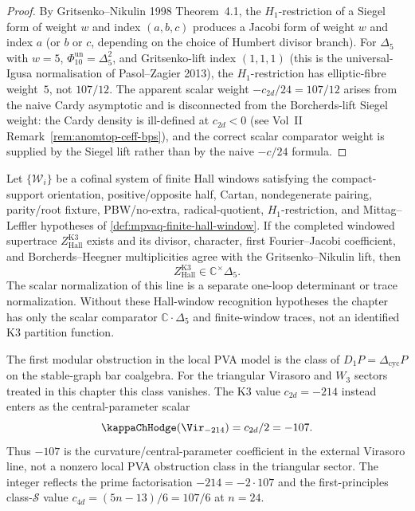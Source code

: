 \begin{proof}
By Gritsenko--Nikulin 1998 Theorem~4.1, the $H_1$-restriction of
a Siegel form of weight $w$ and index $(a,b,c)$ produces a
Jacobi form of weight $w$ and index $a$ (or $b$ or $c$, depending
on the choice of Humbert divisor branch). For
$\Delta_5$ with $w = 5$, $\Phi_{10}^{\mathrm{un}}=\Delta_5^2$, and Gritsenko-lift
index $(1, 1, 1)$ (this is the universal-Igusa normalisation of
Pasol--Zagier 2013), the $H_1$-restriction has
elliptic-fibre weight~$5$, not $107/12$. The apparent scalar weight
$-c_{2d}/24 = 107/12$ arises from the naive Cardy asymptotic and
is disconnected from the Borcherds-lift Siegel weight: the Cardy
density is ill-defined at $c_{2d} < 0$ (see Vol~II
Remark~\ref{rem:anomtop-ceff-bps}), and the correct
scalar comparator weight is supplied by the Siegel lift rather than by
the naive $-c/24$ formula.
\end{proof}

\begin{remark}
\label{rem:mpvaq-conditional-partition-recognition}
Let $\{\mathcal W_i\}$ be a cofinal system of finite Hall windows
satisfying the compact-support orientation, positive/opposite half,
Cartan, nondegenerate pairing, parity/root fixture, PBW/no-extra,
radical-quotient, $H_1$-restriction, and Mittag--Leffler hypotheses of
\cref{def:mpvaq-finite-hall-window}.  If the completed windowed
supertrace $Z_{\mathrm{Hall}}^{\mathrm{K3}}$ exists and its divisor,
character, first Fourier--Jacobi coefficient, and Borcherds--Heegner
multiplicities agree with the Gritsenko--Nikulin lift, then
\[
Z_{\mathrm{Hall}}^{\mathrm{K3}}\in \mathbb C^\times\Delta_5.
\]
The scalar normalization of this line is a separate one-loop determinant
or trace normalization.  Without these Hall-window recognition
hypotheses the chapter has only the scalar comparator
$\mathbb C\cdot\Delta_5$ and finite-window traces, not an identified
K3 partition function.
\end{remark}

\begin{remark}[Modular PVA obstruction class at $c_{2d} = -214$]
\label{rem:mpvaq-obstruction}
The first modular obstruction in the local PVA model is the class of
$D_1P=\Delta_{\mathrm{cyc}}P$ on the stable-graph bar coalgebra. For
the triangular Virasoro and $W_3$ sectors treated in this chapter this
class vanishes. The K3 value $c_{2d}=-214$ instead enters as the
central-parameter scalar
\[
 \kappaChHodge(\Vir_{-214})=c_{2d}/2=-107.
\]
Thus $-107$ is the curvature/central-parameter coefficient in the
external Virasoro line, not a nonzero local PVA obstruction class in
the triangular sector. The integer reflects the prime factorisation
$-214=-2\cdot107$ and the first-principles class-$\mathcal S$ value
$c_{4d}=(5n-13)/6=107/6$ at $n=24$.
\end{remark}
